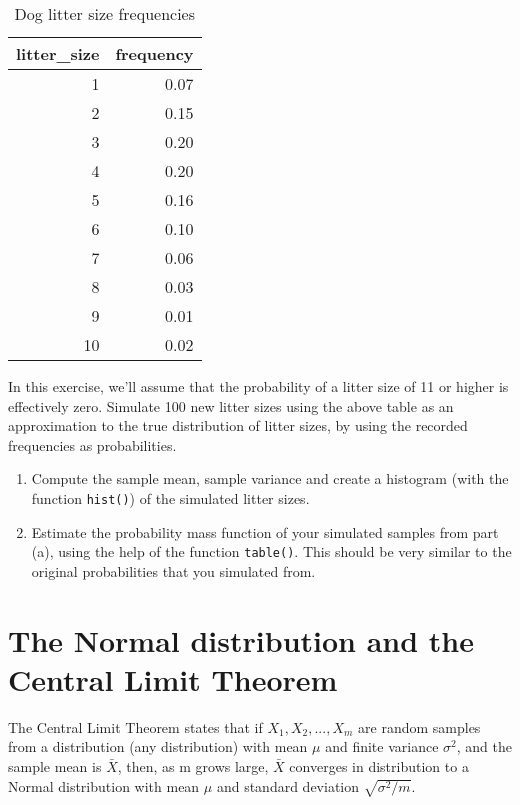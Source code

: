 \documentclass[
]{book}
\begin{document}
\begin{table}

\caption{\label{tab:unnamed-chunk-24}Dog litter size frequencies}
\centering
\begin{tabular}[t]{r|r}
\hline
litter\_size & frequency\\
\hline
1 & 0.07\\
\hline
2 & 0.15\\
\hline
3 & 0.20\\
\hline
4 & 0.20\\
\hline
5 & 0.16\\
\hline
6 & 0.10\\
\hline
7 & 0.06\\
\hline
8 & 0.03\\
\hline
9 & 0.01\\
\hline
10 & 0.02\\
\hline
\end{tabular}
\end{table}

In this exercise, we'll assume that the probability of a litter size of 11 or higher is effectively zero. Simulate 100 new litter sizes using the above table as an approximation to the true distribution of litter sizes, by using the recorded frequencies as probabilities.

\begin{enumerate}
\def\labelenumi{\alph{enumi})}
\item
  Compute the sample mean, sample variance and create a histogram (with the function \texttt{hist()}) of the simulated litter sizes.
\item
  Estimate the probability mass function of your simulated samples from part (a), using the help of the function \texttt{table()}. This should be very similar to the original probabilities that you simulated from.
\end{enumerate}

\hypertarget{the-normal-distribution-and-the-central-limit-theorem}{%
\section{The Normal distribution and the Central Limit Theorem}\label{the-normal-distribution-and-the-central-limit-theorem}}

The Central Limit Theorem states that if \(X_1, X_2, ..., X_m\) are random samples from a distribution (any distribution) with mean \(\mu\) and finite variance \(\sigma^2\), and the sample mean is \(\bar{X}\), then, as m grows large, \(\bar{X}\) converges in distribution to a Normal distribution with mean \(\mu\) and standard deviation \(\sqrt{\sigma^2 /m}\).
\end{document}
